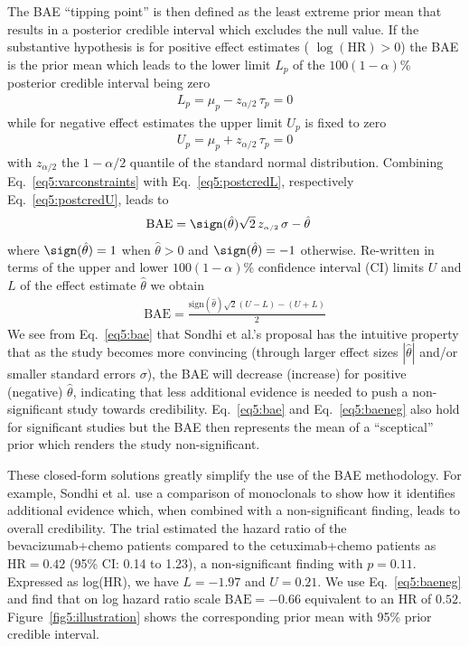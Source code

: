 The BAE ``tipping point'' is then defined as the least extreme prior mean that
results in a posterior credible interval which excludes the null value. If the
substantive hypothesis is for positive effect estimates (\eg{}
$\log(\mbox{HR}) > 0$) the BAE is the prior mean which leads to the lower limit
$L_{p}$ of the $100(1 - \alpha)$\% posterior credible interval being zero
\begin{align}
  L_{p} = \mu_{p} - z_{\scriptscriptstyle \alpha/2} \, \tau_{p} = 0
  \label{eq5:postcredL}
\end{align}
while for negative effect estimates the upper limit $U_{p}$ is fixed to zero
\begin{align}
  U_{p} = \mu_{p} + z_{\scriptscriptstyle \alpha/2} \, \tau_{p} = 0
  \label{eq5:postcredU}
\end{align}
with $z_{\scriptscriptstyle \alpha/2}$ the $1 - \alpha/2$ quantile of the
standard normal distribution. Combining Eq.~\eqref{eq5:varconstraints} with
Eq.~\eqref{eq5:postcredL}, respectively Eq.~\eqref{eq5:postcredU}, leads to
\begin{align}
  \text{BAE}
  & =  \sign(\hat{\theta}) \sqrt{2} \, z_{\scriptscriptstyle \alpha/2} \, \sigma - \hat{\theta}
    \label{eq5:bae}
\end{align}
where $\sign(\hat{\theta}) = 1$ when $\hat{\theta} > 0$ and
$\sign(\hat{\theta}) = -1$ otherwise. Re-written in terms of the upper and lower
$100(1 - \alpha)$\% confidence interval (CI) limits $U$ and $L$ of the effect
estimate $\hat{\theta}$ we obtain
\begin{align}
  \text{BAE} = \frac{\text{sign}(\hat{\theta}) \sqrt{2} (U - L) - (U + L)}{2}
  \label{eq5:baeneg}
\end{align}
We see from Eq.~\eqref{eq5:bae} that Sondhi et al.'s proposal has the intuitive
property that as the study becomes more convincing (through larger effect sizes
$|\hat{\theta}|$ and/or smaller standard errors $\sigma$), the BAE will decrease
(increase) for positive (negative) $\hat{\theta}$, indicating that less
additional evidence is needed to push a non-significant study towards
credibility. Eq.~\eqref{eq5:bae} and Eq.~\eqref{eq5:baeneg} also hold for
significant studies but the BAE then represents the mean of a ``sceptical''
prior which renders the study non-significant.





These closed-form solutions greatly simplify the use of the BAE methodology. For
example, Sondhi et al. use a comparison of monoclonals to show how it identifies
additional evidence which, when combined with a non-significant finding, leads
to overall credibility. The trial estimated the hazard ratio of the
bevacizumab+chemo patients compared to the cetuximab+chemo patients as
$\mbox{HR} = 0.42$ (95\% CI: 0.14 to 1.23), a non-significant finding with $p = 0.11$. Expressed as log(HR), we
have $L = -1.97$ and
$U = 0.21$. We use Eq.~\eqref{eq5:baeneg} and find that
on log hazard ratio scale $\mbox{BAE} = -0.66$ equivalent to an
HR of $0.52$. Figure~\ref{fig5:illustration} shows the
corresponding prior mean with 95\% prior
credible interval.

